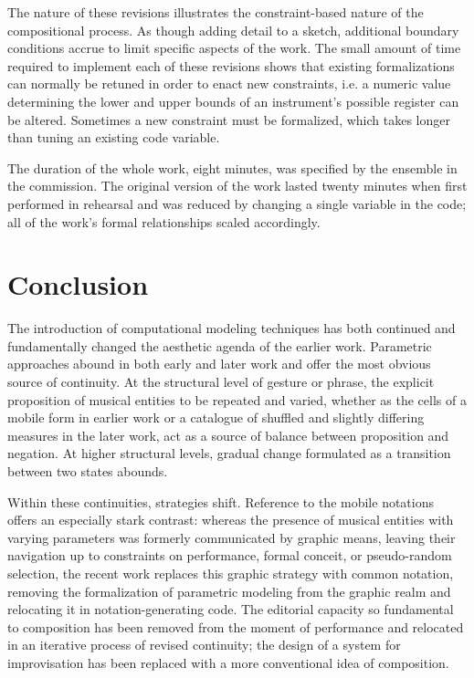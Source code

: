 The nature of these revisions illustrates the constraint-based nature of the compositional process. As though adding detail to a sketch, additional boundary conditions accrue to limit specific aspects of the work. The small amount of time required to implement each of these revisions shows that existing formalizations can normally be retuned in order to enact new constraints, i.e. a numeric value determining the lower and upper bounds of an instrument's possible register can be altered. Sometimes a new constraint must be formalized, which takes longer than tuning an existing code variable.

The duration of the whole work, eight minutes, was specified by the ensemble in the commission. The original version of the work lasted twenty minutes when first performed in rehearsal and was reduced by changing a single variable in the code; all of the work's formal relationships scaled accordingly.
\section{Conclusion}

The introduction of computational modeling techniques has both continued and fundamentally changed the aesthetic agenda of the earlier work. Parametric approaches abound in both early and later work and offer the most obvious source of continuity. At the structural level of gesture or phrase, the explicit proposition of musical entities to be repeated and varied, whether as the cells of a mobile form in earlier work or a catalogue of shuffled and slightly differing measures in the later work, act as a source of balance between proposition and negation. At higher structural levels, gradual change formulated as a transition between two states abounds.

Within these continuities, strategies shift. Reference to the mobile notations offers an especially stark contrast: whereas the presence of musical entities with varying parameters was formerly communicated by graphic means, leaving their navigation up to constraints on performance, formal conceit, or pseudo-random selection, the recent work replaces this graphic strategy with common notation, removing the formalization of parametric modeling from the graphic realm and relocating it in notation-generating code. The editorial capacity so fundamental to composition has been removed from the moment of performance and relocated in an iterative process of revised continuity; the design of a system for improvisation has been replaced with a more conventional idea of composition.

